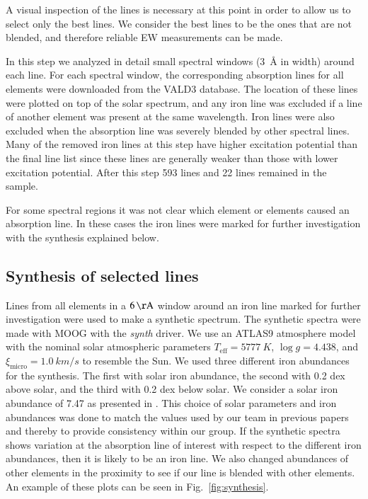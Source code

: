 \documentclass{aa}
\begin{document}
A visual inspection of the lines is necessary at this point in order to
allow us to select only the best lines. We consider the best lines to be
the ones that are not blended, and therefore reliable EW measurements
can be made.

In this step we analyzed in detail small spectral windows
(\SI{3}{\angstrom} in width) around each line. For each spectral window,
the corresponding absorption lines for all elements were downloaded
from the VALD3 database. The location of these lines were plotted on
top of the solar spectrum, and any iron line was excluded if a line of
another element was present at the same wavelength. Iron lines were
also excluded when the absorption line was severely blended by other
spectral lines. Many of the removed iron lines at this step have higher
excitation potential than the final line list since these lines are
generally weaker than those with lower excitation potential. After this
step 593  lines and 22  lines remained in the
sample.

For some spectral regions it was not clear which element or elements
caused an absorption line. In these cases the iron lines were marked for
further investigation with the synthesis explained below.


\subsection{Synthesis of selected lines}
\label{sub:synthesis_of_selected_lines}

Lines from all elements in a $\SI{6}{\AA}$ window around an iron line
marked for further investigation were used to make a synthetic spectrum.
The synthetic spectra were made with MOOG with the \emph{synth} driver.
We use an ATLAS9 atmosphere model \citep{Kurucz1993} with the nominal
solar atmospheric parameters $T_\mathrm{eff}=\SI{5777}{K}$, $\log
g = 4.438$, and $\xi_\mathrm{micro} = \SI{1.0}{km/s}$ to resemble
the Sun. We used three different iron abundances for the synthesis.
The first with solar iron abundance, the second with 0.2 dex above
solar, and the third with 0.2 dex below solar. We consider a solar iron
abundance of 7.47 as presented in \cite{Gonzalez2000}. This choice
of solar parameters and iron abundances was done to match the values
used by our team in previous papers \citep[see e.g.][and references
therein]{Santos13} and thereby to provide consistency within our group.
If the synthetic spectra shows variation at the absorption line of
interest with respect to the different iron abundances, then it is
likely to be an iron line. We also changed abundances of other elements
in the proximity to see if our line is blended with other elements. An
example of these plots can be seen in Fig.~\ref{fig:synthesis}.
\end{document}
